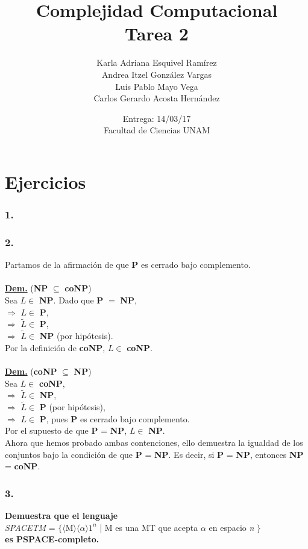 \documentclass[12pt]{article}
\title{Complejidad Computacional \\ Tarea 2}
\author{Karla Adriana Esquivel Ramírez \\ Andrea Itzel González Vargas\\ Luis Pablo Mayo Vega \\ Carlos Gerardo Acosta Hernández}
\date{Entrega: 14/03/17 \\ Facultad de Ciencias UNAM}
\begin{document}
\maketitle
\section*{Ejercicios}

\subsubsection*{1.}

\subsubsection*{2.}
Partamos de la afirmación de que \textbf{P} es cerrado bajo complemento.\\
\noindent\\
\underline{\textbf{Dem.}} (\textbf{NP} $\subseteq$ \textbf{coNP}) \\
Sea $L \in $ \textbf{NP}. Dado que \textbf{P} $=$ \textbf{NP},\\
$\Rightarrow$ $L \in $ \textbf{P},\\
$\Rightarrow$ $\widetilde{L} \in $ \textbf{P}, \\
$\Rightarrow$ $\widetilde{L} \in $ \textbf{NP} (por hipótesis). \\Por la definición de \textbf{coNP}, $L \in $ \textbf{coNP}.\\
\noindent \\
\underline{\textbf{Dem.}} (\textbf{coNP} $\subseteq$ \textbf{NP}) \\
Sea $L \in $ \textbf{coNP},\\
$\Rightarrow$ $\widetilde{L} \in $ \textbf{NP},\\
$\Rightarrow$ $\widetilde{L} \in $ \textbf{P} (por hipótesis),\\
$\Rightarrow$ $L \in $ \textbf{P}, pues \textbf{P} es cerrado bajo complemento.\\
Por el supuesto de que \textbf{P} = \textbf{NP}, ${L} \in $ \textbf{NP}. \\

Ahora que hemos probado ambas contenciones, ello demuestra la igualdad de los conjuntos bajo la condición de que \textbf{P} = \textbf{NP}.
Es decir, si \textbf{P} = \textbf{NP}, entonces \textbf{NP} = \textbf{coNP}.


\subsubsection*{3.}
\textbf{Demuestra que el lenguaje} \\
\indent \textit{SPACETM} = $\{ \langle$M$\rangle \langle \alpha 
\rangle 1^n$ | M es una MT que acepta $\alpha$ en espacio \textit{n} $\}$ \\
\textbf{es PSPACE-completo.} \\
\end{document}

